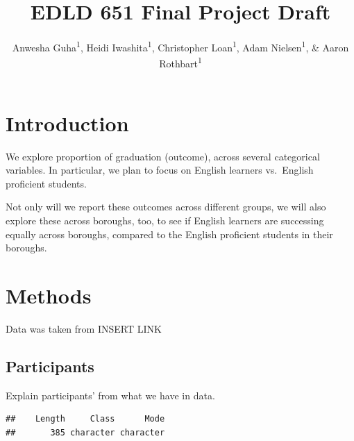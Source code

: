 \documentclass[
  english,
  man, fleqn, noextraspace]{apa6}
\title{EDLD 651 Final Project Draft}
\author{Anwesha Guha\textsuperscript{1}, Heidi Iwashita\textsuperscript{1}, Christopher Loan\textsuperscript{1}, Adam Nielsen\textsuperscript{1}, \& Aaron Rothbart\textsuperscript{1}}
\date{}
\affiliation{\vspace{0.5cm}\textsuperscript{1} University of Oregon}
\newenvironment{Shaded}{\begin{snugshade}}{\end{snugshade}}
\newcommand{\CommentTok}[1]{\textcolor[rgb]{0.56,0.35,0.01}{\textit{#1}}}
\newcommand{\KeywordTok}[1]{\textcolor[rgb]{0.13,0.29,0.53}{\textbf{#1}}}
\newcommand{\NormalTok}[1]{#1}
\newcommand{\OperatorTok}[1]{\textcolor[rgb]{0.81,0.36,0.00}{\textbf{#1}}}
\newcommand{\StringTok}[1]{\textcolor[rgb]{0.31,0.60,0.02}{#1}}
\begin{document}
\maketitle

\hypertarget{introduction}{%
\section{Introduction}\label{introduction}}

We explore proportion of graduation (outcome), across several categorical variables. In particular, we plan to focus on English learners vs.~English proficient students.

Not only will we report these outcomes across different groups, we will also explore these across boroughs, too, to see if English learners are successing equally across boroughs, compared to the English proficient students in their boroughs.

\hypertarget{methods}{%
\section{Methods}\label{methods}}

Data was taken from INSERT LINK

\hypertarget{participants}{%
\subsection{Participants}\label{participants}}

Explain participants' from what we have in data.

\begin{Shaded}
\end{Shaded}

\begin{verbatim}
##    Length     Class      Mode 
##       385 character character
\end{verbatim}
\end{document}
